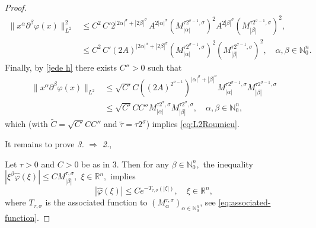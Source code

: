 \documentclass{article}
\theoremstyle{thmstyleone}
\theoremstyle{thmstyletwo}%
\theoremstyle{thmstylethree}%
\begin{document}
\begin{proof}
    \begin{align*}
        \|x^\alpha \partial^\beta\varphi(x)\|^2_{L^2} &\leq C^2\,C' 2^{|2\alpha|^\sigma+|2\beta|^\sigma}\,  A^{2|\alpha|^\sigma} (M_{|\alpha|}^{\tau 2^{\sigma-1},\sigma})^2 A^{2|\beta|^\sigma} (M_{|\beta|}^{\tau 2^{\sigma-1},\sigma})^2 ,
    \\
    &\leq  C^2\,C' (2A)^{|2\alpha|^\sigma+|2\beta|^\sigma} (M_{|\alpha|}^{\tau 2^{\sigma-1},\sigma})^2 (M_{|\beta|}^{\tau 2^{\sigma-1},\sigma})^2, \quad \alpha,\beta\in \mathbb N_0^n.
    \end{align*}
   Finally, by \eqref{jede h} there exists $C''>0$ such that
     \begin{align*}
        \|x^\alpha \partial^\beta\varphi(x)\|_{L^2} &\leq \sqrt{C'} C ((2A)^{2^{\sigma-1}})^{|\alpha|^\sigma+|\beta|^\sigma} M_{|\alpha|}^{\tau 2^{\sigma-1},\sigma} M_{|\beta|}^{\tau 2^{\sigma-1},\sigma} \\
        &\leq \sqrt{C'} C C'' M_{|\alpha|}^{\tau 2^\sigma,\sigma} M_{|\beta|}^{\tau 2^\sigma,\sigma},\quad \alpha,\beta\in \mathbb N_0^n,
    \end{align*}
    which (with $\tilde C=\sqrt{C'} C C''$ and $\tilde \tau=\tau 2^\sigma$) implies \eqref{eq:L2Roumieu}.
    
It remains to prove  {\em 3.} $ \Rightarrow $ {\em 2.},
    
    Let $\tau>0$ and $C>0$ be as in 3. Then for any $\beta \in\mathbb N_0^n,$ the inequality $|\xi^\beta \widehat\varphi(\xi)|\leq CM_{|\beta|}^{\tau,\sigma},$ $\xi \in\mathbb R^n,$ implies 
    $$
    |\widehat\varphi(\xi)|\leq Ce^{-T_{\tau,\sigma}(|\xi|)},\quad \xi \in\mathbb R^n,
    $$ 
    where $T_{\tau,\sigma}$ 
    is the associated function to $(M_{\alpha}^{\tau,\sigma})_{\alpha\in\mathbb N_0^n}$, see 
    \eqref{eq:associated-function}.


\end{proof}
\end{document}
